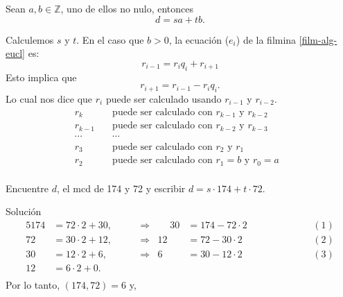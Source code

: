 \documentclass[handout]{beamer} %
\begin{document}
    
    
    \begin{frame}\label{film-alg-eucl-2}
        
        Sean $a, b \in \mathbb{Z}$, uno de ellos no nulo, entonces 
        $$
        d=sa+tb.
        $$
        \pause
        
        Calculemos $s$ y $t$. En el caso que $b >0$,  la  ecuación ($e_{i}$) de la filmina \ref{film-alg-eucl} es:
        $$
        r_{i-1}=r_{i}q_{i} + r_{i+1}
        $$\pause
        Esto implica que 
        $$
        r_{i+1} = r_{i-1}-r_{i}q_{i}.
        $$\pause
        Lo cual nos dice que $r_i$  puede ser calculado usando $r_{i-1}$ y $r_{i-2}$.
        \pause
        \begin{align*}
            r_{k} \quad &\text{puede ser calculado con $r_{k-1}$ y $r_{k-2} $ } \\
            r_{k-1} \quad &\text{puede ser calculado con $r_{k-2}$ y $r_{k-3} $ } \\
            \cdots\quad &\cdots \\
            r_{3} \quad &\text{puede ser calculado con $r_{2}$ y $r_{1} $ } \\
            r_{2} \quad &\text{puede ser calculado con $r_{1} =b$ y $r_{0}=a $ } \\
        \end{align*}
        
        
    \end{frame}
    
    
    
    \begin{frame}
        \begin{ejemplo} Encuentre $d$, el mcd de 174 y 72 y  escribir $d = s \cdot 174 + t \cdot 72$.
        \end{ejemplo}\pause
        {\color{blue} Solución}
        \pause 
        \begin{alignat*}5
            174&=72\cdot 2+30,& \;\quad&\Rightarrow&  \;\quad 30 &=     174-72\cdot 2& &\; &\quad\quad\quad&(1)\\
            72&=30\cdot 2+12,& \;&\Rightarrow& 12&=72-30\cdot 2& \; & \; &&(2) \\
            30&=12\cdot 2+6,& \;&\Rightarrow& 6&=    30-12\cdot 2& \; & \; &&(3)\\
            12&=6\cdot 2+0.& \;&&  && &&\\
        \end{alignat*} \pause \vskip -1.0cm
        Por lo tanto,     $(174,72) = 6$ y,
    \end{frame}
    
\end{document}
